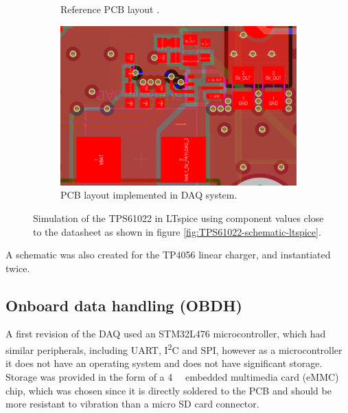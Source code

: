 \documentclass[draft]{report}
\newcommand{\iic}{{I\textsuperscript{2}C}}
\begin{document}
\begin{figure}[H]
  \begin{subfigure}{0.495\textwidth}
    \centering
    
    \caption{Reference PCB layout \cite{ti2021tps61022}.}
  \end{subfigure}
  \begin{subfigure}{0.495\textwidth}
    \centering
    \includegraphics[width=\linewidth]{images/TPS61022-pcb-layout.svg.png}
    \caption{PCB layout implemented in DAQ system.}
  \end{subfigure}
  \caption{Simulation of the TPS61022 in LTspice using component values close to the datasheet as shown in figure \ref{fig:TPS61022-schematic-ltspice}.}
  \label{fig:TPS61022-layout}
\end{figure}

A schematic was also created for the TP4056 linear charger, and instantiated twice.

\subsection{Onboard data handling (OBDH)}

A first revision of the DAQ used an STM32L476 microcontroller, which had similar peripherals, including UART, {\iic} and SPI, however as a microcontroller it does not have an operating system and does not have significant storage. Storage was provided in the form of a \SI{4}{\giga\byte} embedded multimedia card (eMMC) chip, which was chosen since it is directly soldered to the PCB and should be more resistant to vibration than a micro SD card connector.
\end{document}
